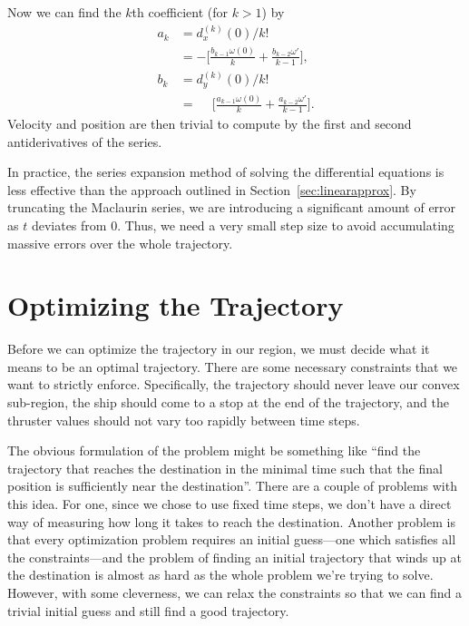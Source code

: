 \documentclass{report}
\begin{document}
Now we can find the $k$th coefficient (for $k > 1$) by
\begin{equation}
    \begin{aligned}
        a_k &= d_x^{(k)}(0)/k! \\
            &= -\Bigg[ \frac{b_{k-1} \omega(0)}{k}  + \frac{b_{k-2} \omega'}{k-1}  \Bigg],\\
        b_k &= d_y^{(k)}(0)/k! \\
            &= \phantom{-} \Bigg[ \frac{a_{k-1} \omega(0)}{k}  + \frac{a_{k-2} \omega'}{k-1}  \Bigg].
    \end{aligned}
\end{equation}
Velocity and position are then trivial to compute by the first and second antiderivatives
of the series.

In practice, the series expansion method of solving the differential equations is less effective
than the approach outlined in Section~\ref{sec:linearapprox}. By truncating the Maclaurin series, we
are introducing a significant amount of error as $t$ deviates from $0$. Thus, we need a very small step size
to avoid accumulating massive errors over the whole trajectory.

\section{Optimizing the Trajectory}
Before we can optimize the trajectory in our region, we must decide what it means to
be an optimal trajectory. There are some necessary constraints that we want to strictly enforce. Specifically,
the trajectory should never leave our convex sub-region, the ship should come to a stop at the end of
the trajectory, and the thruster values should not vary too rapidly between time steps.

The obvious formulation of the problem might be something like ``find the trajectory that reaches the destination
in the minimal time such that the final position is sufficiently near the destination''. There are a couple of problems
with this idea. For one, since we chose to use fixed time steps, we don't have a direct way of measuring how
long it takes to reach the destination. Another problem is that every optimization problem requires an initial guess---one
which satisfies all the constraints---and the problem of finding an initial trajectory that winds up at the destination
is almost as hard as the whole problem we're trying to solve. However, with some cleverness, we can relax the constraints
so that we can find a trivial initial guess and still find a good trajectory.
\end{document}
